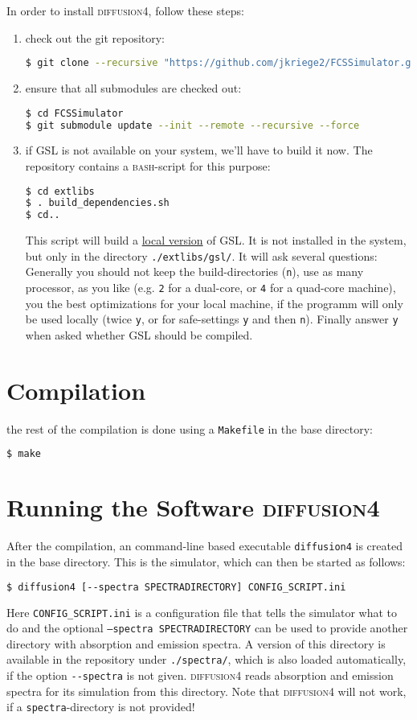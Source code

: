 \documentclass[a4paper,twoside,10pt]{report}
\newcommand{\df}{\textsc{diffusion4}\xspace}
\newcommand{\bash}{\textsc{bash}\xspace}
\begin{document}
\noindent In order to install \df, follow these steps:
\begin{enumerate}
	\item check out the git repository: 
	  \begin{lstlisting}[language=bash] 
$ git clone --recursive "https://github.com/jkriege2/FCSSimulator.git"
		\end{lstlisting}
	\item ensure that all submodules are checked out: 
	  \begin{lstlisting}[language=bash] 
$ cd FCSSimulator
$ git submodule update --init --remote --recursive --force
		\end{lstlisting}
	\item if GSL is not available on your system, we'll have to build it now. The repository contains a \bash-script for this purpose: 
	  \begin{lstlisting}[language=bash] 
$ cd extlibs
$ . build_dependencies.sh
$ cd..
		\end{lstlisting}
		This script will build a \underline{local version} of GSL. It is not installed in the system, but only in the directory \texttt{./extlibs/gsl/}. It will ask several questions: Generally you should not keep the build-directories (\texttt{n}), use as many processor, as you like (e.g. \texttt{2} for a dual-core, or \texttt{4} for a quad-core machine), you the best optimizations for your local machine, if the programm will only be used locally (twice \texttt{y}, or for safe-settings \texttt{y} and then \texttt{n}). Finally answer \texttt{y} when asked whether GSL should be compiled.
\end{enumerate}

\section{Compilation}
\label{sec:Compilation}
the rest of the compilation is done using a \texttt{Makefile} in the base directory:
\begin{lstlisting}[language=bash] 
$ make 
\end{lstlisting}

\section{Running the Software \df}
\label{sec:RunningTheSoftware}
After the compilation, an command-line based executable \texttt{diffusion4} is created in the base directory. This is the simulator, which can then be started as follows:
\begin{lstlisting}[language=bash] 
$ diffusion4 [--spectra SPECTRADIRECTORY] CONFIG_SCRIPT.ini 
\end{lstlisting}
Here \texttt{CONFIG\_SCRIPT.ini} is a configuration file that tells the simulator what to do and the optional \texttt{--spectra SPECTRADIRECTORY} can be used to provide another directory with absorption and emission spectra. A version of this directory is available in the repository under \verb!./spectra/!, which is also loaded automatically, if the option \verb!--spectra! is not given. \df reads absorption and emission spectra for its simulation from this directory. Note that \df will not work, if a \texttt{spectra}-directory is not provided!
\end{document}
